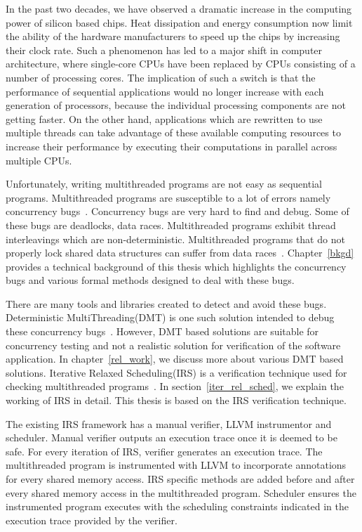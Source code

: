 In the past two decades, we have observed a dramatic increase in the computing power of silicon based chips. 
Heat dissipation and energy consumption now limit the ability of the hardware manufacturers to speed up the chips by increasing their clock rate. 
Such a phenomenon has led to a major shift in computer architecture, where single-core CPUs have been replaced by CPUs consisting of a number of processing cores. 
The implication of such a switch is that the performance of sequential applications would no longer increase with each generation of processors, because the individual processing components are not getting faster. 
On the other hand, applications which are rewritten to use multiple threads can take advantage of these available computing resources to increase their performance by executing their computations in parallel across multiple CPUs. 

Unfortunately, writing multithreaded programs are not easy as sequential programs. 
Multithreaded programs are susceptible to a lot of errors namely concurrency bugs~\citep{carver2005modern}. 
Concurrency bugs are very hard to find and debug. 
Some of these bugs are deadlocks, data races. 
Multithreaded programs exhibit thread interleavings which are non-deterministic. 
Multithreaded programs that do not properly lock shared data structures can suffer from data races~\citep{netzer1992race}. 
Chapter~\ref{bkgd} provides a technical background of this thesis which highlights the concurrency bugs and various formal methods designed to deal with these bugs.

There are many tools and libraries created to detect and avoid these bugs. 
Deterministic MultiThreading(DMT) is one such solution intended to debug these concurrency bugs~\citep{dthreads}. 
However, DMT based solutions are suitable for concurrency testing and not a realistic solution for verification of the software application. 
In chapter~\ref{rel_work}, we discuss more about various DMT based solutions.  
Iterative Relaxed Scheduling(IRS) is a verification technique used for checking multithreaded programs~\citep{metzler2017quick}. 
In section~\ref{iter_rel_sched}, we explain the working of IRS in detail. 
This thesis is based on the IRS verification technique. 

The existing IRS framework has a manual verifier, LLVM instrumentor and scheduler. 
Manual verifier outputs an execution trace once it is deemed to be safe. 
For every iteration of IRS, verifier generates an execution trace. 
The multithreaded program is instrumented with LLVM to incorporate annotations for every shared memory access. 
IRS specific methods are added before and after every shared memory access in the multithreaded program. 
Scheduler ensures the instrumented program executes with the scheduling constraints indicated in the execution trace provided by the verifier. 

